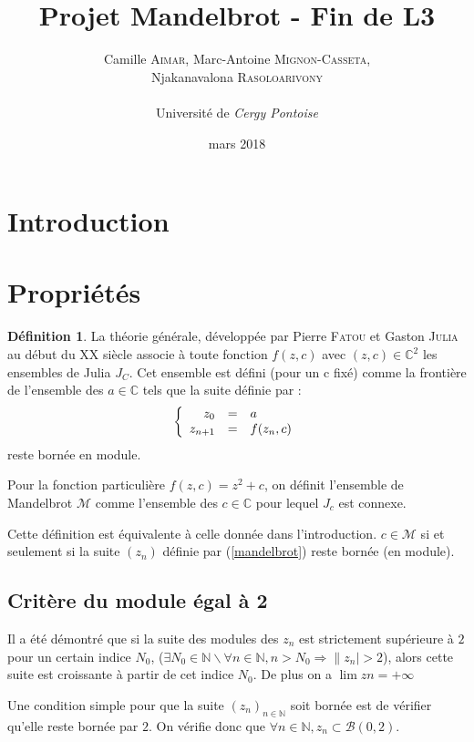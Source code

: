 \documentclass[12pt,a4paper]{report}
\title{Projet Mandelbrot - Fin de L3}
\author{Camille \textsc{Aimar}, Marc-Antoine \textsc{Mignon-Casseta},\\Njakanavalona \textsc{Rasoloarivony} \\ \\ Université de\emph{ Cergy Pontoise}}
\date{mars 2018}
\theoremstyle{plain}
\theoremstyle{plain}
\theoremstyle{definition}
\newtheorem{definition}{Définition}
\theoremstyle{remark}
\begin{document}
\maketitle
\setcounter{chapter}{1}
\section{Introduction}

\newpage
\section{Propriétés}
	\begin{definition}
La théorie générale, développée par Pierre \textsc{Fatou} et Gaston \textsc{Julia} au début du \textsc{XX}\ieme {} siècle associe à toute fonction $f(z,c)$ avec $(z,c) \in \mathbb{C}^2$ les ensembles de Julia $J_C$. Cet ensemble est défini (pour un c fixé) comme la frontière de l'ensemble des $a \in \mathbb{C}$ tels que la suite définie par :
\begin{equation}\label{julia}
\left\{
\begin{array}{r c l}
z_0 &=& a\\
z_{n+1} &=& f(z_n, c)
\end{array}
\right.
\end{equation}
reste bornée en module.
\end{definition}

Pour la fonction particulière $f(z,c)=z^2+c$, on définit l'ensemble de Mandelbrot $\mathcal{M}$ comme l'ensemble des $c \in \mathbb{C}$ pour lequel $J_c$ est connexe.

Cette définition est équivalente à celle donnée dans l'introduction. $c \in \mathcal{M}$ si et seulement si la suite $(z_n)$ définie par (\ref{mandelbrot}) reste bornée (en module).

	\subsection{Critère du module égal à 2}
Il a été démontré que si la suite des modules des $z_n$ est strictement supérieure à $2$ pour un certain indice $N_0$,
($\exists N_0 \in \mathbb{N} \backslash \forall n \in \mathbb{N},{} n>N_0 \Longrightarrow \|z_n|>2$), alors cette suite est croissante à partir de cet indice $N_0$. De plus on a $\lim zn = +\infty$

Une condition simple pour que la suite $(z_n)_{n \in \mathbb{N}}$ soit bornée est de vérifier qu'elle reste bornée par $2$. On vérifie donc que $\forall n \in \mathbb{N}, z_n \subset \mathcal{B}(0,2)$.
\end{document}
